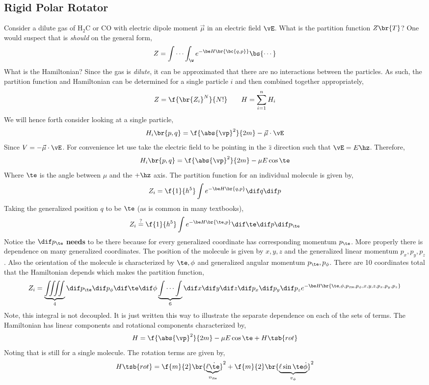 \documentclass{article}
\begin{document}
\subsection{Rigid Polar Rotator} Consider a dilute gas of $\text{H}_2\text{C}$ or $\text{CO}$ with electric dipole moment $\vec{\mu}$ in an electric field $\vE$. What is the partition function $Z\br{T}$? One would suspect that is \textit{should} on the general form,
\[ Z = \idotsint_{\w} e^{-\be H\br{\bc{q,p}}} \bs{ \cdots } \]
What is the Hamiltonian? Since the gas is \textit{dilute}, it can be approximated that there are no interactions between the particles. As such, the partition function and Hamiltonian can be determined for a single particle $i$ and then combined together appropriately,
\[ Z = \f{\br{Z_i}^N}{N!} \qquad H = \sum_{i=1}^{n} H_i \]
We will hence forth consider looking at a single particle,
\[ H_i \br{p,q} = \f{\abs{\vp}^2}{2m} - \vec{\mu} \cdot \vE \]
Since $V = - \vec{\mu} \cdot \vE$. For convenience let use take the electric field to be pointing in the $\hat{z}$ direction such that $\vE = E \hz$. Therefore,
\[ H_i \br{p,q} = \f{\abs{\vp}^2}{2m} - \mu E \cos \te \]
Where $\te$ is the angle between $\mu$ and the $+\hz$ axis. The partition function for an individual molecule is given by,
\[ Z_i = \f{1}{h^5}\int e^{-\be H\br{q,p}} \dif q \dif p \]
Taking the generalized position $q$ to be $\te$ (as is common in many textbooks),
\[ Z_i \stackrel{?}{=} \f{1}{h^5}\int e^{-\be H\br{\te,p}} \dif \te \dif p \dif p_\te \]
Notice the $\dif p_\te$ \textbf{needs} to be there because for every generalized coordinate has corresponding momentum $p_\te$. More properly there is dependence on many generalized coordinates. The position of the molecule is given by $x,y,z$ and the generalized linear momentum $p_x, p_y, p_z$. Also the orientation of the molecule is characterized by $\te, \phi$ and generalized angular momentum $p_\te, p_\phi$. There are 10 coordinates total that the Hamiltonian depends which makes the partition function,
\[ Z_i = \underbrace{\iiiint}_{4} \dif p_\te \dif p_\phi \dif \te \dif \phi \underbrace{\idotsint}_{6} \dif x \dif y \dif z \dif p_x \dif p_y \dif p_z e^{-\be H \br{\te, \phi, p_\te, p_\phi, x, y, z, p_x, p_y, p_z}} \]
Note, this integral is not decoupled. It is just written this way to illustrate the separate dependence on each of the sets of terms. The Hamiltonian has linear components and rotational components characterized by,
\[ H = \f{\abs{\vp}^2}{2m} - \mu E \cos \te + H\tsb{rot} \]
Noting that is still for a single molecule. The rotation terms are given by,
\[ H\tsb{rot} = \f{m}{2}\br{\underbrace{\ell \dot{\te}}_{v_\te}}^2 + \f{m}{2} \br{\underbrace{\ell \sin \te \dot{\phi}}_{v_\phi}}^2 \]
\end{document}
